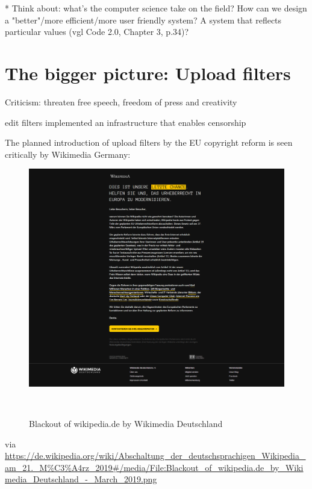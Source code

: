 * Think about: what's the computer science take on the field? How can we design a "better"/more efficient/more user friendly system? A system that reflects particular values (vgl Code 2.0, Chapter 3, p.34)?


\section{The bigger picture: Upload filters}

Criticism: threaten free speech, freedom of press and creativity

edit filters implemented an infrastructure that enables censorship


The planned introduction of upload filters by the EU copyright reform is seen critically by Wikimedia Germany:
\begin{figure}
\centering
  \includegraphics[width=0.9\columnwidth]{pics/Blackout_of_wikipediade_by_Wikimedia_Deutschland_-_March_2019.png}
  \caption{Blackout of wikipedia.de by Wikimedia Deutschland}~\label{fig:blackout-upload-filters}
\end{figure}

via
\url{https://de.wikipedia.org/wiki/Abschaltung_der_deutschsprachigen_Wikipedia_am_21._M%C3%A4rz_2019#/media/File:Blackout_of_wikipedia.de_by_Wikimedia_Deutschland_-_March_2019.png}

